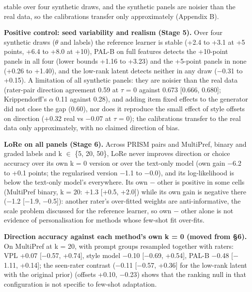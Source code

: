 \documentclass{article}
\begin{document}
stable over four synthetic draws, and the synthetic panels are noisier than the real data, so the calibrations transfer only approximately (Appendix B).

\textbf{Positive control: seed variability and realism (Stage 5).} Over four synthetic draws ($\theta$ and labels) the reference learner is stable (+2.4 to +3.1 at +5 points, +6.4 to +8.0 at +10), PAL-B on full features detects the +10-point panels in all four (lower bounds +1.16 to +3.23) and the +5-point panels in none (+0.26 to +1.40), and the low-rank latent detects neither in any draw ($-$0.31 to +0.15). A limitation of all synthetic panels: they are noisier than the real data (rater-pair direction agreement 0.59 at $\tau$ = 0 against 0.673 {[}0.666, 0.680{]}; Krippendorff's $\alpha$ 0.11 against 0.28), and adding item fixed effects to the generator did not close the gap (0.60), nor does it reproduce the small effect of style offsets on direction (+0.32 real vs $-$0.07 at $\tau$ = 0); the calibrations transfer to the real data only approximately, with no claimed direction of bias.

\textbf{LoRe on all panels (Stage 6).} Across PRISM pairs and MultiPref, binary and graded labels and k $\in$ \{5, 20, 50\}, LoRe never improves direction or choice accuracy over its own k = 0 version or over the text-only model (own gain $-$6.2 to +0.1 points; the regularised version $-$1.1 to $-$0.0), and its log-likelihood is below the text-only model's everywhere. Its own $-$ other is positive in some cells (MultiPref binary, k = 20: +1.3 {[}+0.5, +2.0{]}) while its own gain is negative there ($-$1.2 {[}$-$1.9, $-$0.5{]}): another rater's over-fitted weights are anti-informative, the scale problem discussed for the reference learner, so own $-$ other alone is not evidence of personalisation for methods whose few-shot fit over-fits.

\textbf{Direction accuracy against each method's own k = 0 (moved from \S{}6).} On MultiPref at k = 20, with prompt groups resampled together with raters: VPL +0.07 {[}$-$0.57, +0.74{]}, style model $-$0.10 {[}$-$0.69, +0.54{]}, PAL-B $-$0.48 {[}$-$1.11, +0.14{]}; the seen-rater contrast ($-$0.11 {[}$-$0.57, +0.36{]} for the low-rank latent with the original prior) (offsets +0.10, $-$0.23) shows that the ranking null in that configuration is not specific to few-shot adaptation.
\end{document}

